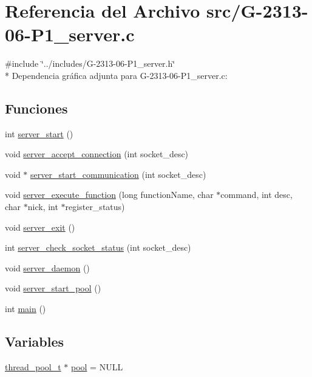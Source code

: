 \hypertarget{G-2313-06-P1__server_8c}{}\section{Referencia del Archivo src/\+G-\/2313-\/06-\/\+P1\+\_\+server.c}
\label{G-2313-06-P1__server_8c}
{\ttfamily \#include \char`\"{}../includes/\+G-\/2313-\/06-\/\+P1\+\_\+server.\+h\char`\"{}}\\*
Dependencia gráfica adjunta para G-\/2313-\/06-\/\+P1\+\_\+server.c\+:
\subsection*{Funciones}
\begin{DoxyCompactItemize}
\item 
int \hyperlink{G-2313-06-P1__server_8c_aa8cae03a9b52c7a550cbbdcc8aa74ede}{server\+\_\+start} ()
\item 
void \hyperlink{G-2313-06-P1__server_8c_aaac8642d2e699e0f9d942d28a9b233c2}{server\+\_\+accept\+\_\+connection} (int socket\+\_\+desc)
\item 
void $\ast$ \hyperlink{G-2313-06-P1__server_8c_a81394df6131e7cf998bd06f63f9e3995}{server\+\_\+start\+\_\+communication} (int socket\+\_\+desc)
\item 
void \hyperlink{G-2313-06-P1__server_8c_a775161328c3264fb8f96981f7a9c83ae}{server\+\_\+execute\+\_\+function} (long function\+Name, char $\ast$command, int desc, char $\ast$nick, int $\ast$register\+\_\+status)
\item 
void \hyperlink{G-2313-06-P1__server_8c_a0e947005d451a8f3bf3af01f54b59f11}{server\+\_\+exit} ()
\item 
int \hyperlink{G-2313-06-P1__server_8c_a64f1fffc5903ccf0350845cd21a95b6e}{server\+\_\+check\+\_\+socket\+\_\+status} (int socket\+\_\+desc)
\item 
void \hyperlink{G-2313-06-P1__server_8c_aa0e8000b12d9c52fc1e87847d00c9c47}{server\+\_\+daemon} ()
\item 
void \hyperlink{G-2313-06-P1__server_8c_a48d522cd984dc64ecd084f05416b1a94}{server\+\_\+start\+\_\+pool} ()
\item 
int \hyperlink{G-2313-06-P1__server_8c_ae66f6b31b5ad750f1fe042a706a4e3d4}{main} ()
\end{DoxyCompactItemize}
\subsection*{Variables}
\begin{DoxyCompactItemize}
\item 
\hyperlink{structthread__pool__t}{thread\+\_\+pool\+\_\+t} $\ast$ \hyperlink{G-2313-06-P1__server_8c_a57d8a6a060b67bdc5946cd0e7331575a}{pool} = N\+U\+LL
\end{DoxyCompactItemize}


